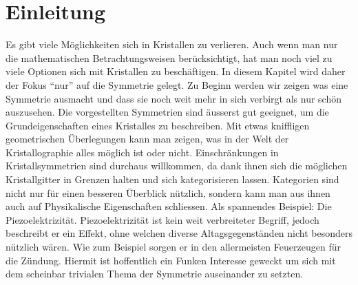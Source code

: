 \section{Einleitung}
Es gibt viele Möglichkeiten sich in Kristallen zu verlieren.
Auch wenn man nur die mathematischen Betrachtungsweisen berücksichtigt, 
hat man noch viel zu viele Optionen sich mit Kristallen zu beschäftigen.
In diesem Kapitel wird daher der Fokus ``nur'' auf die Symmetrie gelegt.
Zu Beginn werden wir zeigen was eine Symmetrie ausmacht und 
dass sie noch weit mehr in sich verbirgt als nur schön auszusehen.
Die vorgestellten Symmetrien sind äusserst gut geeignet, 
um die Grundeigenschaften eines Kristalles zu beschreiben.
Mit etwas kniffligen geometrischen Überlegungen kann man zeigen, 
was in der Welt der Kristallographie alles möglich ist oder nicht.
Einschränkungen in Kristallsymmetrien sind durchaus willkommen, 
da dank ihnen sich die möglichen Kristallgitter in Grenzen halten
und sich kategorisieren lassen. 
Kategorien sind nicht nur für einen besseren Überblick nützlich, 
sondern kann man aus ihnen auch auf Physikalische Eigenschaften schliessen. 
Als spannendes Beispiel: Die Piezoelektrizität.
Piezoelektrizität ist kein weit verbreiteter Begriff, 
jedoch beschreibt er ein Effekt, ohne welchen diverse Altagsgegenständen nicht besonders nützlich wären. 
Wie zum Beispiel sorgen er in den allermeisten Feuerzeugen für die Zündung.
Hiermit ist hoffentlich ein Funken Interesse geweckt 
um sich mit dem scheinbar trivialen Thema der Symmetrie auseinander zu setzten.



